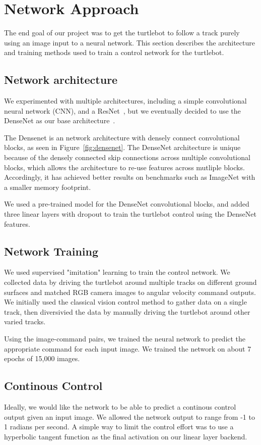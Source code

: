 \section{Network Approach}
\label{sec:network}
The end goal of our project was to get the turtlebot to follow a track purely using an image input to a neural network.
This section describes the architecture and training methods used to train a control network for the turtlebot.

\subsection{Network architecture}
We experimented with multiple architectures, including a simple convolutional neural network (CNN), and a ResNet~\cite{ResNet}, but we eventually decided to use the DenseNet as our base architecture~\cite{DenseNet}.

The Densenet is an network architecture with densely connect convolutional blocks, as seen in Figure~\ref{fig:densenet}. The DenseNet architecture is unique because of the densely connected skip connections across multiple convolutional blocks, which allows the architecture to re-use features across mutliple blocks. Accordingly, it has achieved better results on benchmarks such as ImageNet with a smaller memory footprint.

We used a pre-trained model for the DenseNet convolutional blocks, and added three linear layers with dropout to train the turtlebot control using the DenseNet features.

\subsection{Network Training}
We used supervised "imitation" learning to train the control network. We collected data by driving the turtlebot around multiple tracks on different ground surfaces and matched RGB camera images to angular velocity command outputs. We initially used the classical vision control method to gather data on a single track, then diversivied the data by manually driving the turtlebot around other varied tracks.

Using the image-command pairs, we trained the neural network to predict the appropriate command for each input image. We trained the network on about 7 epochs of 15,000 images.

\subsection{Continous Control}
Ideally, we would like the network to be able to predict a continous control output given an input image. We allowed the network output to range from -1 to 1 radians per second. A simple way to limit the control effort was to use a hyperbolic tangent function as the final activation on our linear layer backend.

